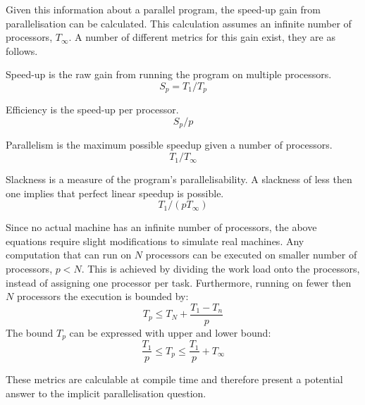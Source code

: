 Given this information about a parallel program, the speed-up gain from parallelisation can be calculated. This calculation assumes an infinite number of processors, $T_\infty$. A number of different metrics for this gain exist, they are as follows.
\begin{labeling}{\quad\quad}
    \item[Speed-up] is the raw gain from running the program on multiple processors.
    \begin{equation*}
        S_p = T_1/T_p
    \end{equation*}
    \item[Efficiency] is the speed-up per processor.
    \begin{equation*}
        S_p/p
    \end{equation*}
    \item[Parallelism] is the maximum possible speedup given a number of processors.
    \begin{equation*}
        T_1/T_\infty
    \end{equation*}
    \item[Slackness] is a measure of the program's parallelisability. A slackness of less then one implies that perfect linear speedup is possible.
    \begin{equation*}
        T_1/(pT_\infty)
    \end{equation*}
\end{labeling}
Since no actual machine has an infinite number of processors, the above equations require slight modifications to simulate real machines. Any computation that can run on $N$ processors can be executed on smaller number of processors, $p < N$\cite{Gustafson2011}. This is achieved by dividing the work load onto the processors, instead of assigning one processor per task. Furthermore, running on fewer then $N$ processors the execution is bounded by:
\begin{equation*}
    T_p \leq T_N + \frac{T_1 - T_n}{p}
\end{equation*}
The bound $T_p$ can be expressed with upper and lower bound\cite{brent1974parallel}:
\begin{equation*}
    \frac{T_1}{p} \leq T_p \leq \frac{T_1}{p} + T_\infty
\end{equation*}

These metrics are calculable at compile time and therefore present a potential answer to the implicit parallelisation question.